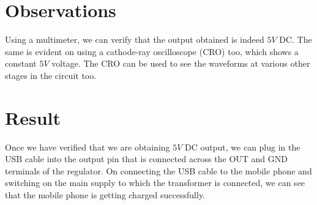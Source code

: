\documentclass[journal,12pt,twocolumn]{IEEEtran}
\numberwithin{figure}{section}
\begin{document}
	\section{Observations}
	Using a multimeter, we can verify that the output obtained is indeed $5 V$ DC. The same is evident on using a cathode-ray oscilloscope (CRO) too, which shows a constant $5 V$ voltage. The CRO can be used to see the waveforms at various other stages in the circuit too.
	
	\section{Result}	
	Once we have verified that we are obtaining $5 V$ DC output, we can plug in the USB cable into the output pin that is connected across the OUT and GND terminals of the regulator. On connecting the USB cable to the mobile phone and switching on the main supply to which the transformer is connected, we can see that the mobile phone is getting charged successfully.
	
	
\end{document}
